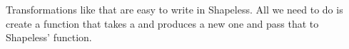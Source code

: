 \begin{example}

Transformations like that are easy to write in Shapeless. All we need to do
is create a function that takes a  and produces a new one and pass
that to Shapeless'  function.



\end{example}
